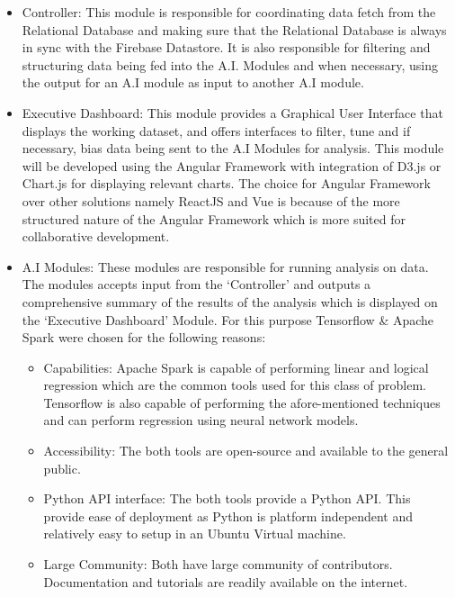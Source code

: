 \documentclass{report}
\begin{document}
    \begin{itemize}
        \item {Controller}: This module is responsible for coordinating data fetch from the Relational Database and making sure 
        that the Relational Database is always in sync with the Firebase Datastore. It is also responsible for filtering
        and structuring data being fed into the A.I. Modules and when necessary, using the output for an A.I module as input to
        another A.I module. 
        \item{Executive Dashboard}: This module provides a Graphical User Interface that displays the working dataset, and 
        offers interfaces to filter, tune and if necessary, bias data being sent to the A.I Modules for analysis. This module will
        be developed using the Angular Framework with integration of D3.js or Chart.js for displaying relevant charts. The choice 
        for Angular Framework over other solutions namely ReactJS and Vue is because of the more structured nature of the 
        Angular Framework which is more suited for collaborative development. 
        \item{A.I Modules}: These modules are responsible for running analysis on data. The modules accepts input from the 
        `Controller' and outputs a comprehensive summary of the results of the analysis which is displayed on the 
        `Executive Dashboard' Module. For this purpose Tensorflow \& Apache Spark were chosen for the following reasons:
        \begin{itemize}
            \item{Capabilities}: Apache Spark is capable of performing linear and logical regression which are the common tools
            used for this class of problem. Tensorflow is also capable of performing the afore-mentioned techniques and can 
            perform regression using neural network models.  
            \item {Accessibility}: The both tools are open-source and available to the general public.
            \item {Python API interface}: The both tools provide a Python API. This provide ease of deployment as Python is 
            platform independent and relatively easy to setup in an Ubuntu Virtual machine. 
            \item{Large Community}: Both have large community of contributors. Documentation and tutorials are readily available 
            on the internet. 
        \end{itemize}

\end{itemize}
\end{document}
